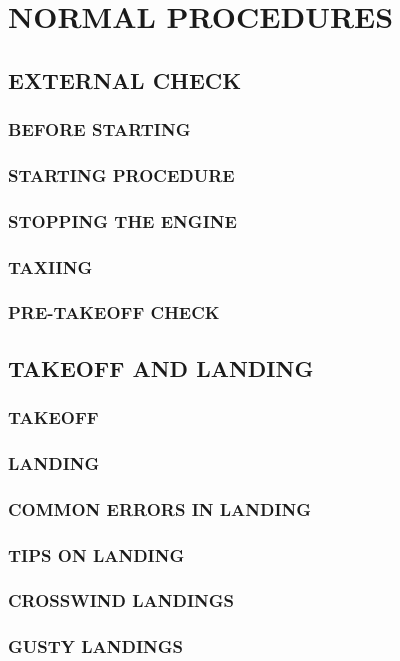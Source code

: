 \chapter{NORMAL PROCEDURES}
\minitoc
\cleardoublepage


\section{EXTERNAL CHECK}
\subsection{BEFORE STARTING}
\subsection{STARTING PROCEDURE}
\subsection{STOPPING THE ENGINE}
\subsection{TAXIING}
\subsection{PRE-TAKEOFF CHECK}


\section{TAKEOFF AND LANDING}
\subsection{TAKEOFF}
\subsection{LANDING}
\subsection{COMMON ERRORS IN LANDING}
\subsection{TIPS ON LANDING}
\subsection{CROSSWIND LANDINGS}
\subsection{GUSTY LANDINGS}
